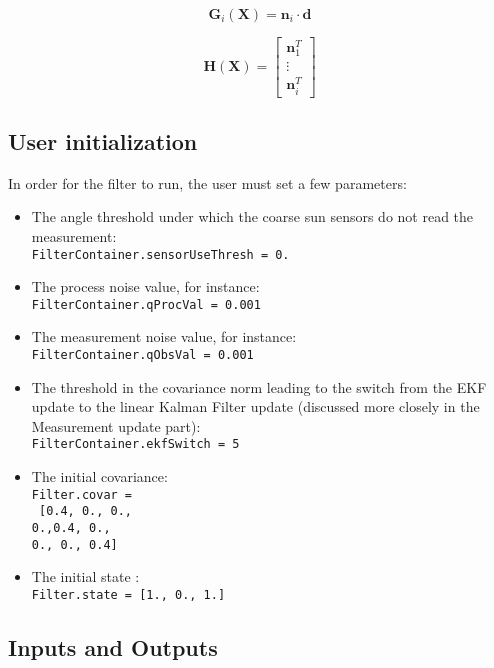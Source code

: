 \documentclass[]{BasiliskReportMemo}
\begin{document}
\begin{equation}\label{eq:meas}
\bm G_i(\bm X) = \bm n_i \cdot \bm d
\end{equation}

\begin{equation}\label{eq:Hmat}
\bm H(\bm X) = \begin{bmatrix} \bm n_1^T \\ \vdots \\ \bm n_i^T \end{bmatrix} 
\end{equation}

\subsection{User initialization}


In order for the filter to run, the user must set a few parameters:


\begin{itemize}
\item The angle threshold under which the coarse sun sensors do not read the measurement: \\ 
\texttt{FilterContainer.sensorUseThresh = 0.}
\item The process noise value, for instance:\\
 \texttt{FilterContainer.qProcVal = 0.001}
\item The measurement noise value, for instance: \\
 \texttt{FilterContainer.qObsVal = 0.001}
 \item The threshold in the covariance norm leading to the switch from the EKF update to the linear Kalman Filter update (discussed more closely in the Measurement update part):\\
 \texttt{FilterContainer.ekfSwitch = 5}
\item The initial covariance: \\
 \texttt{Filter.covar =} \\
  \texttt{ [0.4, 0., 0., \\ 0.,0.4, 0.,  \\ 0., 0., 0.4]}
 \item The initial state :\\
 \texttt{Filter.state = [1., 0., 1.]}
\end{itemize}


\subsection{Inputs and Outputs}
\end{document}
